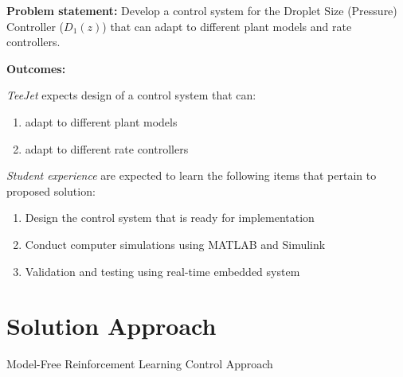 %

{\bf Problem statement:} Develop a control system for the Droplet Size (Pressure) Controller ($D_1(z)$) that can adapt to different plant models and rate controllers.

{\bf Outcomes:}

\textit{TeeJet} expects design of a control system that can: %
\begin{enumerate}
\item adapt to different plant models
\item adapt to different rate controllers 
\end{enumerate}

\textit{Student experience} are expected to learn the following items that pertain to proposed solution:
\begin{enumerate}
\item Design the control system that is ready for implementation
  
\item Conduct computer simulations using MATLAB and Simulink
  
\item Validation and testing using real-time embedded system 
  

\end{enumerate}


\section{Solution Approach}
\label{sec:solutionApproach}

Model-Free Reinforcement Learning Control Approach

